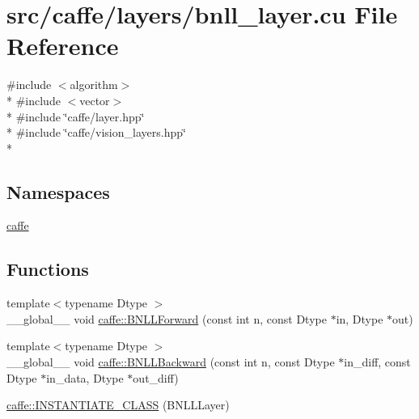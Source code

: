 \hypertarget{bnll__layer_8cu}{\section{src/caffe/layers/bnll\+\_\+layer.cu File Reference}
\label{bnll__layer_8cu}
}
{\ttfamily \#include $<$algorithm$>$}\\*
{\ttfamily \#include $<$vector$>$}\\*
{\ttfamily \#include \char`\"{}caffe/layer.\+hpp\char`\"{}}\\*
{\ttfamily \#include \char`\"{}caffe/vision\+\_\+layers.\+hpp\char`\"{}}\\*
\subsection*{Namespaces}
\begin{DoxyCompactItemize}
\item 
 \hyperlink{namespacecaffe}{caffe}
\end{DoxyCompactItemize}
\subsection*{Functions}
\begin{DoxyCompactItemize}
\item 
{\footnotesize template$<$typename Dtype $>$ }\\\+\_\+\+\_\+global\+\_\+\+\_\+ void \hyperlink{namespacecaffe_ac548467e1292199237ab19aa45f5c811}{caffe\+::\+B\+N\+L\+L\+Forward} (const int n, const Dtype $\ast$in, Dtype $\ast$out)
\item 
{\footnotesize template$<$typename Dtype $>$ }\\\+\_\+\+\_\+global\+\_\+\+\_\+ void \hyperlink{namespacecaffe_a0f76f2632b52e7b302516e706e3db06e}{caffe\+::\+B\+N\+L\+L\+Backward} (const int n, const Dtype $\ast$in\+\_\+diff, const Dtype $\ast$in\+\_\+data, Dtype $\ast$out\+\_\+diff)
\item 
\hyperlink{namespacecaffe_a301bc2174de79871a19fb90bb561791b}{caffe\+::\+I\+N\+S\+T\+A\+N\+T\+I\+A\+T\+E\+\_\+\+C\+L\+A\+S\+S} (B\+N\+L\+L\+Layer)
\end{DoxyCompactItemize}
